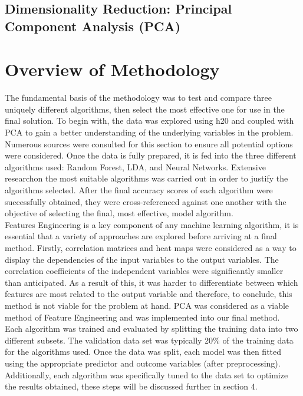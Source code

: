 \documentclass{article}
\begin{document}
\subsection{Dimensionality Reduction: Principal Component Analysis (PCA)}

\section{Overview of Methodology}
The fundamental basis of the methodology was to test and compare three uniquely different algorithms, then select the most effective one for use in the final solution. To begin with, the data was explored using h20 and coupled with PCA to gain a better understanding of the underlying variables in the problem. Numerous sources\cite{source1,source2,source3} were consulted for this section to ensure all potential options were considered. Once the data is fully prepared, it is fed into the three different algorithms used: Random Forest, LDA, and Neural Networks. Extensive research\cite{h2o,research2}on the most suitable algorithms was carried out in order to justify the algorithms selected. After the final accuracy scores of each algorithm were successfully obtained, they were cross-referenced against one another with the objective of selecting the final, most effective,  model algorithm.\\

Features Engineering is a key component of any machine learning algorithm, it is essential that a variety of approaches are explored before arriving at a final method. Firstly, correlation matrices and heat maps were considered as a way to display the dependencies of the input variables to the output variables. The correlation coefficients of the independent variables were significantly smaller than anticipated. As a result of this, it was harder to differentiate between which features are most related to the output variable and therefore, to conclude, this method is not viable for the problem at hand. PCA was considered as a viable method of Feature Engineering and was implemented into our final method. \\

Each algorithm was trained and evaluated by splitting the training data into two different subsets. The validation data set was typically 20\% of the training data for the algorithms used. Once the data was split, each model was then fitted using the appropriate predictor and outcome variables (after preprocessing). Additionally, each algorithm was specifically tuned to the data set to optimize the results obtained, these steps will be discussed further in section 4.
\end{document}
